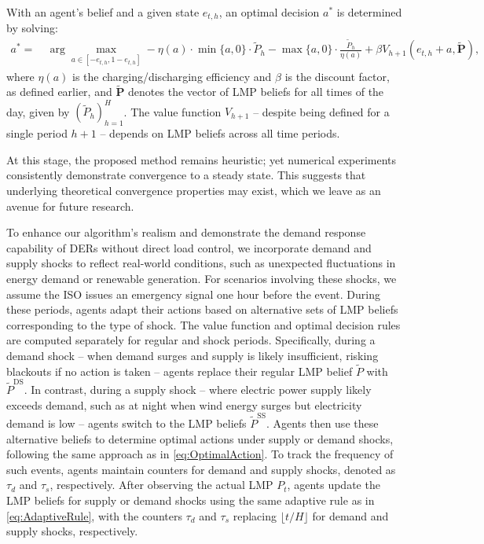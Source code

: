 \documentclass{article}
\theoremstyle{definition}
\theoremstyle{plain}
\begin{document}
With an agent's belief and a given state \( e_{t,h} \), an optimal decision \( a^* \) is determined by solving:
\begin{align}
a^* =\  & \arg\max_{a \in [-e_{t,h}, 1-e_{t,h}]} 
-\eta(a) \cdot \min\{a,0\} \cdot \widetilde{P}_h  -\max\{a,0\} \cdot \frac{\widetilde{P}_h}{\eta(a)}
+ \beta V_{h+1}(e_{t,h} + a, \widetilde{\mathbf{P}}), \label{eq:OptimalAction}
\end{align}
where \( \eta(a) \) is the charging/discharging efficiency and \( \beta \) is the discount factor, as defined earlier, and $\widetilde{\mathbf{P}}$ denotes the vector of LMP beliefs for all times of the day, given by $(\widetilde{P}_h )_{h=1}^H$. The value function $V_{h+1}$ -- despite being defined for a single period $h+1$ -- depends on LMP beliefs across all time periods.



At this stage, the proposed method remains heuristic; yet numerical experiments consistently demonstrate convergence to a steady state. This suggests that underlying theoretical convergence properties may exist, which we leave as an avenue for future research.

To enhance our algorithm's realism and demonstrate the demand response capability of DERs without direct load control, we incorporate demand and supply shocks to reflect real-world conditions, such as unexpected fluctuations in energy demand or renewable generation. For scenarios involving these shocks, we assume the ISO issues an emergency signal one hour before the event. During these periods, agents adapt their actions based on alternative sets of LMP beliefs corresponding to the type of shock. The value function and optimal decision rules are computed separately for regular and shock periods. Specifically, during a demand shock -- when demand surges and supply is likely insufficient, risking blackouts if no action is taken -- agents replace their regular LMP belief \( \widetilde{P} \) with \( \widetilde{P}^{\text{DS}} \). In contrast, during a supply shock -- where electric power supply likely exceeds demand, such as at night when wind energy surges but electricity demand is low -- agents switch to the LMP beliefs \( \widetilde{P}^{\text{SS}} \). Agents then use these alternative beliefs to determine optimal actions under supply or demand shocks, following the same approach as in \eqref{eq:OptimalAction}. To track the frequency of such events, agents maintain counters for demand and supply shocks, denoted as \( \tau_d \) and \( \tau_s \), respectively. After observing the actual LMP \( P_t \), agents update the LMP beliefs for supply or demand shocks using the same adaptive rule as in \eqref{eq:AdaptiveRule}, with the counters \( \tau_d \) and \( \tau_s \) replacing \( \lfloor t/H \rfloor \) for demand and supply shocks, respectively. 
\end{document}
